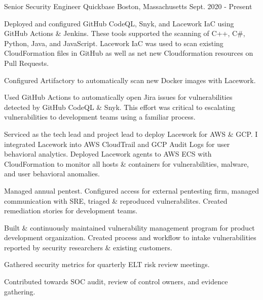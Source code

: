 

\begin{cventries}
\vspace{-3mm}
  \cventry
    {Senior Security Engineer} %
    {Quickbase} %
    {Boston, Massachusetts} %
    {Sept. 2020 - Present} %
    {
      \begin{cvitems} %
        \item {
            Deployed and configured GitHub CodeQL, Snyk, and Lacework IaC using GitHub Actions \& Jenkins. These tools supported the scanning of C++, C\#, Python, Java, and JavaScript. Lacework IaC was used to scan existing CloudFormation files in GitHub as well as net new Cloudformation resources on Pull Requests.
        }
        \item {
            Configured Artifactory to automatically scan new Docker images with Lacework.
        }
        \item {
            Used GitHub Actions to automatically open Jira issues for vulnerabilities detected by GitHub CodeQL \& Snyk. This effort was critical to escalating vulnerabilities to development teams using a familiar process.
        }
        \item {
            Serviced as the tech lead and project lead to deploy Lacework for AWS \& GCP. I integrated Lacework into AWS CloudTrail and GCP Audit Logs for user behavioral analytics. Deployed Lacework agents to AWS ECS with CloudFormation to monitor all hosts \& containers for vulnerabilities, malware, and user behavioral anomalies.
        }
        \item {
            Managed annual pentest. Configured access for external pentesting firm, managed communication with SRE, triaged \& reproduced vulnerabilites. Created remediation stories for development teams.
        }
        \item {
            Built \& continuously maintained vulnerability management program for product development organization. Created process and workflow to intake vulnerabilities reported by security researchers \& existing customers.
        }
        \item {
            Gathered security metrics for quarterly ELT risk review meetings.
        }
        \item {
            Contributed towards SOC audit, review of control owners, and evidence gathering.
        }
      \end{cvitems}
    }


\end{cventries}
